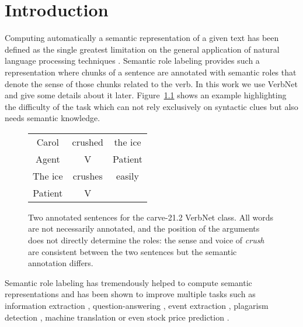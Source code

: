 \chapter{Introduction}
\label{ch:srlintro}


Computing automatically a semantic representation of a given text has been
defined as the single greatest limitation on the general application of natural
language processing techniques \citep{dang1998investigating}. Semantic role
labeling provides such a representation where chunks of a sentence are
annotated with semantic roles that denote the sense of those chunks related to
the verb. In this work we use VerbNet \citep{kipperschuler2005verbnet} and give
some details about it later. Figure~\ref{fig:example_srl} shows an example
highlighting the difficulty of the task which can not rely exclusively on
syntactic clues but also needs semantic knowledge.

\begin{figure}[ht]
    \centering
    \begin{tabular}{ccc}
        \toprule
        Carol & crushed   & the ice \\
        Agent & V         & Patient \\
        \midrule
        The ice & crushes & easily  \\
        Patient & V       &         \\
        \bottomrule
    \end{tabular}
    \caption{\label{fig:example_srl}Two annotated sentences for the carve-21.2 VerbNet class. All words are not necessarily annotated, and the position of the arguments does not directly determine the roles: the sense and voice of \textit{crush} are consistent between the two sentences but the semantic annotation differs.}
\end{figure}

Semantic role labeling has tremendously helped to compute semantic
representations and has been shown to improve multiple tasks such as
information extraction \citep{surdeanu2003using}, question-answering
\citep{shen2007using}, event extraction \citep{exner2011using},
plagarism detection \citep{osman2012improved}, machine translation
\citep{bazrafshan2013semantic} or even stock price prediction
\citep{xie2013semantic}.

